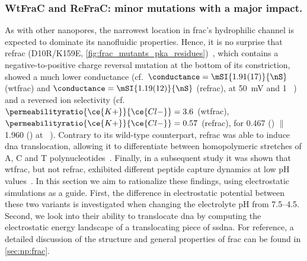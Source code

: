 \subsubsection{{WtFraC} and {ReFraC}: minor mutations with a major impact.}
%
As with other nanopores, the narrowest location in \gls{frac}'s hydrophilic channel is expected to dominate
its nanofluidic properties. Hence, it is no surprise that \gls{refrac} (D10R/K159E,
\cref{fig:frac_mutants_pka_residues})~\cite{Wloka-2016}, which contains a negative-to-positive charge reversal
mutation at the bottom of its constriction, showed a much lower conductance (cf.~$\conductance =
\mSI{1.91(17)}{\nS}$ (\gls{wtfrac}) and $\conductance = \mSI{1.19(12)}{\nS}$ (\gls{refrac}), at \SI{+50}{mV}
and \SI{1}{\Molar} ~\cite{Wloka-2016}) and a reversed ion selectivity
(cf.~$\permeabilityratio{\ce{K+}}{\ce{Cl-}} = 3.6$ (\gls{wtfrac}), $\permeabilityratio{\ce{K+}}{\ce{Cl-}} =
0.57$ (\gls{refrac}), for \SI{0.467}{\Molar}  (\cisi) $\|$ \SI{1.960}{\Molar}  (\transi) at
~\cite{Huang-2017}). Contrary to its wild-type counterpart, \gls{refrac} was able to induce \gls{dna}
translocation, allowing it to differentiate between homopolymeric stretches of A, C and T
polynucleotides~\cite{Wloka-2016}. Finally, in a subsequent study it was shown that \gls{wtfrac}, but not
\gls{refrac}, exhibited different peptide capture dynamics at low pH values~\cite{Huang-2017}. In this section
we aim to rationalize these findings, using electrostatic simulations as a guide. First, the difference in
electrostatic potential between these two variants is investigated when changing the electrolyte pH from
\numrange{7.5}{4.5}. Second, we look into their ability to translocate \gls{dna} by computing the
electrostatic energy landscape of a translocating piece of \gls{ssdna}. For reference, a detailed discussion
of the structure and general properties of \gls{frac} can be found in \cref{sec:np:frac}.

